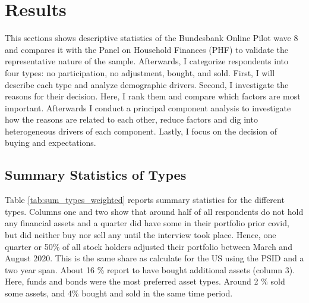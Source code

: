 \documentclass[ProjectABM]{subfiles}
\begin{document}



\section{Results}\label{sec:results}
This sections shows descriptive statistics of the Bundesbank Online Pilot wave 8 and compares it with the Panel on Household Finances (PHF) to validate the representative nature of the sample. Afterwards, I categorize respondents into four types: no participation, no adjustment, bought, and sold. First, I will describe each type and analyze demographic drivers. Second, I investigate the reasons for their decision. Here, I rank them and compare which factors are most important. Afterwards I conduct a principal component analysis to investigate how the reasons are related to each other, reduce factors and dig into heterogeneous drivers of each component. Lastly, I focus on the decision of buying and expectations. 

\subsection{Summary Statistics of Types}\label{sec:des_types}

Table \ref{tab:sum_types_weighted} reports summary statistics for the different types. Columns one and two show that around half of all respondents do not hold any financial assets and a quarter did have some in their portfolio prior covid, but did neither buy nor sell any until the interview took place. Hence, one quarter or 50\% of all stock holders adjusted their portfolio between March and August 2020. This is the same share as \cite{bonaparte_et_al_2012adjustment} calculate for the US using the PSID and a two year span. %
About 16 \% report to have bought additional assets (column 3). Here, funds and bonds were the most preferred asset types. Around 2 \% sold some assets, and 4\% bought and sold in the same time period. 
\end{document}
